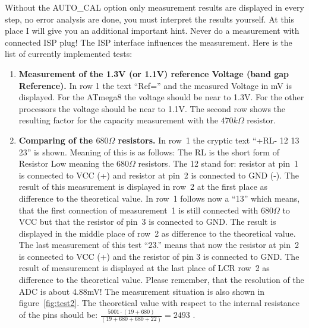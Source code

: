 Without the AUTO\_CAL option only measurement results are displayed in every step, no error analysis are done, you must interpret the results yourself.
At this place I will give you an additional important hint. Never do a measurement with connected ISP plug!
The ISP interface influences the measurement. 
\vspace{1cm}
Here is the list of currently implemented tests:
\vspace{1cm}
\begin{enumerate}
\item {\bf Measurement of the 1.3V (or 1.1V) reference Voltage (band gap Reference).}
In row 1 the text ``Ref='' and the measured Voltage in mV is displayed.
For the ATmega8 the voltage should be near to 1.3V. For the other processors the voltage should be near to 1.1V.
The second row shows the resulting factor for the capacity measurement with the \(470k\Omega\) resistor.
\item {\bf Comparing of the  \(680\Omega\) resistors.}
In row~1 the cryptic text  ``+RL- 12 13 23'' is shown. Meaning of this is as follows: 
The RL is the short form of Resistor Low meaning the \(680\Omega\) resistors. The 12 stand for: 
resistor at pin~1 is connected to VCC (+) and resistor at pin~2 is connected to GND (-). 
The result of this measurement  is displayed in row~2 at the first place as difference to the theoretical value. 
 In row~1 follows now a ``13'' which means, that the first connection of measurement~1 is still connected
with \(680\Omega\) to VCC but that the resistor of pin~3 is connected to GND.
The result is displayed in the middle place of row~2 as difference to the theoretical value. 
The last measurement of this test ``23.'' means that now the resistor at pin~2 is connected to VCC (+) and
the resistor of pin 3 is connected to GND.
The result of measurement is displayed at the last place of LCR row~2 as difference to the theoretical value.
Please remember, that the resolution of the ADC is about 4.88mV!
The measurement situation is also shown in figure~\ref{fig:test2}.
The theoretical value with respect to the internal resistance of the pins should be: 
\(\frac{5001 \cdot  (19+680)}{ (19+680+680+22)} = 2493\) .


\end{enumerate}
